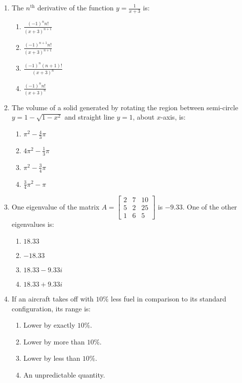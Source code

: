 \documentclass[journal]{IEEEtran}
\newcommand{\brak}[1]{\left( #1 \right)}
\begin{document}
\begin{enumerate}
    \item The $n^{\text{th}}$ derivative of the function $ y = \frac{1}{x+3} $ is:
    \begin{enumerate}
        \item $ \frac{\brak{-1}^n n!}{\brak{x+3}^{n+1}} $
        \item $ \frac{\brak{-1}^{n+1} n!}{\brak{x+3}^{n+1}} $
        \item $ \frac{\brak{-1}^n \brak{n+1}!}{\brak{x+3}^n} $
        \item $ \frac{\brak{-1}^n n!}{\brak{x+3}^n} $
    \end{enumerate}

    \item The volume of a solid generated by rotating the region between semi-circle $ y = 1 - \sqrt{1 - x^2} $ and straight line $ y = 1 $, about $ x $-axis, is:
    \begin{enumerate}
        \item $ \pi^2 - \frac{4}{3} \pi $
        \item $ 4 \pi^2 - \frac{1}{3} \pi $
        \item $ \pi^2 - \frac{3}{4} \pi $
        \item $ \frac{3}{4} \pi^2 - \pi $
    \end{enumerate}

    \item One eigenvalue of the matrix $ A = \begin{bmatrix} 2 & 7 & 10 \\ 5 & 2 & 25 \\ 1 & 6 & 5 \end{bmatrix} $ is $ -9.33 $. One of the other eigenvalues is:
    \begin{enumerate}
        \item $ 18.33 $
        \item $ -18.33 $
        \item $ 18.33 - 9.33i $
        \item $ 18.33 + 9.33i $
    \end{enumerate}

    \item If an aircraft takes off with $10\%$ less fuel in comparison to its standard configuration, its range is:
    \begin{enumerate}
        \item Lower by exactly $10\%$.
        \item Lower by more than $10\%$.
        \item Lower by less than $10\%$.
        \item An unpredictable quantity.
    \end{enumerate}


\end{enumerate}
\end{document}
